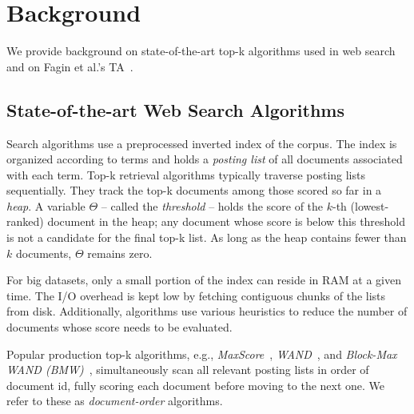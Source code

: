 
\section{Background}
\label{sec:background}

We  provide background on  state-of-the-art top-k algorithms used in web search and on Fagin et al.'s TA~\cite{Fagin:2003}.

\subsection{State-of-the-art Web Search Algorithms}

Search algorithms use a preprocessed inverted index of the corpus. The index is organized according to terms and holds a \emph{posting list} of all documents associated with each term. Top-k retrieval algorithms typically traverse  posting lists sequentially. %
	They track the top-k documents among those scored so far in a \emph{heap}. A variable $\Theta$ -- called the \emph{threshold} -- holds the score of the $k$-th (lowest-ranked) document in the heap;  any document whose  score is below this threshold is not a candidate for the final top-k list. As long as the heap contains fewer than $k$ documents, $\Theta$ remains zero.

For big datasets, only a small portion of the index can reside in RAM at a given time. The I/O overhead is kept low by  fetching contiguous chunks of the lists  from disk. 
Additionally, algorithms use various heuristics to reduce the number of documents whose score needs to be evaluated. 

Popular production top-k algorithms, e.g., 
{\em MaxScore}~\cite{Strohman:2005,Turtle:1995}, {\em WAND}~\cite{Broder:2003}, and {\em Block-Max WAND (BMW)}~\cite{Ding:2011}, 
simultaneously scan all relevant posting lists in order of document id, fully scoring each document before moving to the next one. 
We  refer to these as \emph{document-order} algorithms. 


